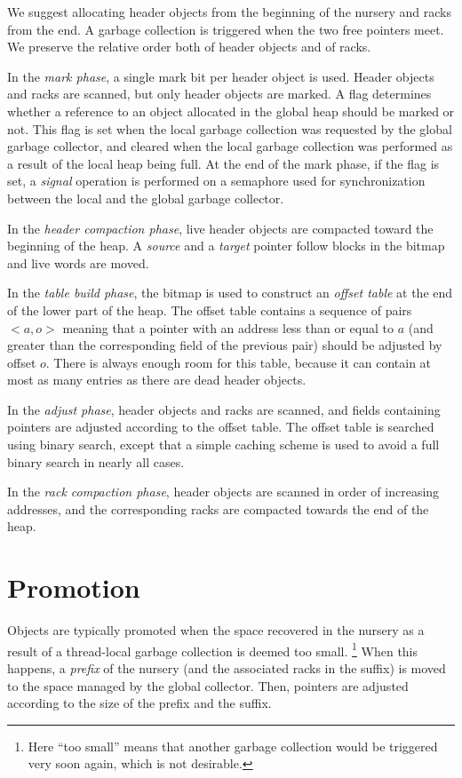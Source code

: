 We suggest allocating header objects from the beginning of the nursery
and racks from the end.  A garbage collection is triggered
when the two free pointers meet.  We preserve the relative order both
of header objects and of racks. 

In the \emph{mark phase}, a single mark bit per header object is used.
Header objects and racks are scanned, but only header objects are
marked.  A flag determines whether a reference to an object allocated
in the global heap should be marked or not.  This flag is set when the
local garbage collection was requested by the global garbage
collector, and cleared when the local garbage collection was performed
as a result of the local heap being full.  At the end of the mark
phase, if the flag is set, a \emph{signal} operation is performed on a
semaphore used for synchronization between the local and the global
garbage collector.

In the \emph{header compaction phase}, live header objects are compacted
toward the beginning of the heap.  A \emph{source} and a \emph{target}
pointer follow blocks in the bitmap and live words are moved. 

In the \emph{table build phase}, the bitmap is used to construct an
\emph{offset table} at the end of the lower part of the heap.  The
offset table contains a sequence of pairs $<a,o>$ meaning that a
pointer with an address less than or equal to $a$ (and greater than
the corresponding field of the previous pair) should be adjusted by
offset $o$.  There is always enough room for this table, because it
can contain at most as many entries as there are dead header objects.  

In the \emph{adjust phase}, header objects and racks are
scanned, and fields containing pointers are adjusted according to the
offset table.  The offset table is searched using binary search,
except that a simple caching scheme is used to avoid a full binary
search in nearly all cases. 

In the \emph{rack compaction phase}, header objects are scanned in
order of increasing addresses, and the corresponding racks
are compacted towards the end of the heap.

\section{Promotion}

Objects are typically promoted when the space recovered in the nursery
as a result of a thread-local garbage collection is deemed too small.%
\footnote{Here ``too small'' means that another garbage collection
  would be triggered very soon again, which is not desirable.}  When
this happens, a \emph{prefix} of the nursery (and the associated
racks in the suffix) is moved to the space managed by the
global collector.  Then, pointers are adjusted according to the size
of the prefix and the suffix. 

